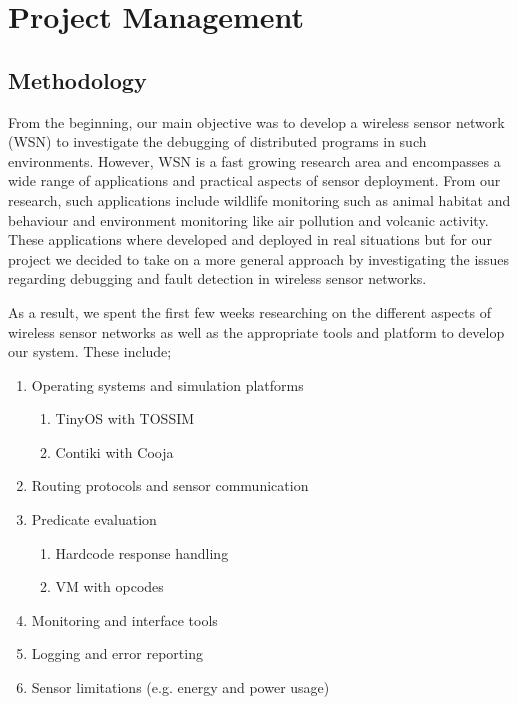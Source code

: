 \section{Project Management}

\subsection{Methodology}

From the beginning, our main objective was to develop a wireless sensor network (WSN) to investigate the debugging of distributed programs in such environments. However, WSN is a fast growing research area and encompasses a wide range of applications and practical aspects of sensor deployment. From our research, such applications include wildlife monitoring such as animal habitat and behaviour and environment monitoring like air pollution and volcanic activity. These applications where developed and deployed in real situations but for our project we decided to take on a more general approach by investigating the issues regarding debugging and fault detection in wireless sensor networks.

As a result, we spent the first few weeks researching on the different aspects of wireless sensor networks as well as the appropriate tools and platform to develop our system. These include;

\begin{enumerate}
	\item Operating systems and simulation platforms
		\begin{enumerate}
			\item TinyOS with TOSSIM
			\item Contiki with Cooja
		\end{enumerate}
	\item Routing protocols and sensor communication
	\item Predicate evaluation
		\begin{enumerate}
			\item Hardcode response handling
			\item VM with opcodes
		\end{enumerate}
	\item Monitoring and interface tools
	\item Logging and error reporting
	\item Sensor limitations (e.g. energy and power usage)
\end{enumerate} 

